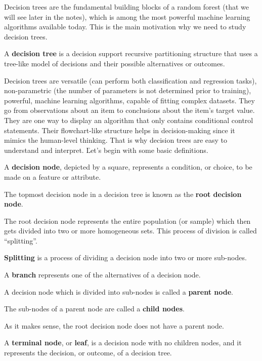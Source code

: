 Decision trees are the fundamental building blocks of a random forest (that we will see later in the notes), which is
among the most powerful machine learning algorithms available today. This is the main motivation why we need to study
decision trees.

A \textbf{decision tree} is a decision support recursive partitioning structure that uses a tree-like model of
decisions and their possible alternatives or outcomes.
\ed

Decision trees are versatile (can perform both classification and regression tasks), non-parametric (the number of
parameters is not determined prior to training), powerful, machine learning algorithms, capable of fitting complex
datasets. They go from observations about an item to conclusions about the item's target value. They are one way to
display an algorithm that only contains conditional control statements. Their flowchart-like structure helps in
decision-making since it mimics the human-level thinking. That is why decision trees are easy to understand and
interpret. \v

Let's begin with some basic definitions.

A \textbf{decision node}, depicted by a square, represents a condition, or choice, to be made on a feature or attribute.
\ed

The topmost decision node in a decision tree is known as the \textbf{root decision node}.
\ed

The root decision node represents the entire population (or sample) which then gets divided into two or more homogeneous
sets. This process of division is called ``splitting''.

\bd[Splitting]
\textbf{Splitting} is a process of dividing a decision node into two or more sub-nodes.
\ed

\bd [Branch]
A \textbf{branch} represents one of the alternatives of a decision node.
\ed

A decision node which is divided into sub-nodes is called a \textbf{parent node}.
\ed

The sub-nodes of a parent node are called a \textbf{child nodes}.
\ed

As it makes sense, the root decision node does not have a parent node.

A \textbf{terminal node}, or \textbf{leaf}, is a decision node with no children nodes, and it represents the decision,
or outcome, of a decision tree.
\ed

